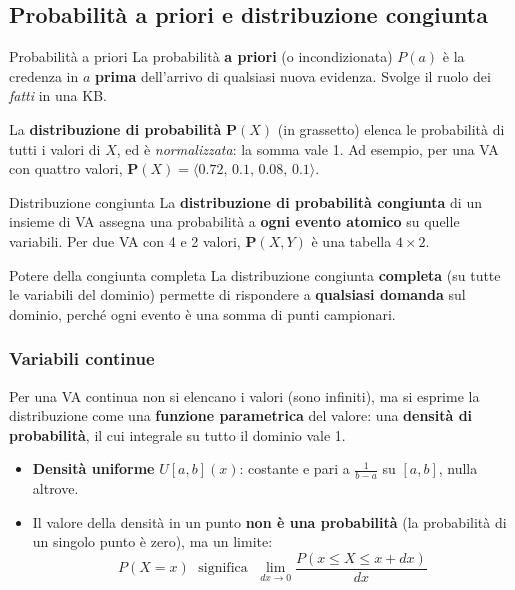 \documentclass[11pt, a4paper]{article}
\renewcommand{\emph}[1]{\textcolor{verdechiaro}{\itshape #1}}
\newcommand{\Pv}{\mathbf{P}}               %
\newcommand{\tup}[1]{\langle #1 \rangle}    %
\begin{document}
\subsection{Probabilità a priori e distribuzione congiunta}

\begin{defbox}{Probabilità a priori}
  La probabilità \textbf{a priori} (o incondizionata) $P(a)$ è la credenza in $a$ \textbf{prima} dell'arrivo di qualsiasi nuova evidenza. Svolge il ruolo dei \emph{fatti} in una KB.

  La \textbf{distribuzione di probabilità} $\Pv(X)$ (in grassetto) elenca le probabilità di tutti i valori di $X$, ed è \emph{normalizzata}: la somma vale 1. Ad esempio, per una VA con quattro valori, $\Pv(X) = \tup{0.72,\, 0.1,\, 0.08,\, 0.1}$.
\end{defbox}

\begin{defbox}{Distribuzione congiunta}
  La \textbf{distribuzione di probabilità congiunta} di un insieme di VA assegna una probabilità a \textbf{ogni evento atomico} su quelle variabili. Per due VA con 4 e 2 valori, $\Pv(X, Y)$ è una tabella $4 \times 2$.
\end{defbox}

\begin{chiave}{Potere della congiunta completa}
  La distribuzione congiunta \textbf{completa} (su tutte le variabili del dominio) permette di rispondere a \textbf{qualsiasi domanda} sul dominio, perché ogni evento è una somma di punti campionari.
\end{chiave}

\subsubsection*{Variabili continue}

Per una VA continua non si elencano i valori (sono infiniti), ma si esprime la distribuzione come una \textbf{funzione parametrica} del valore: una \textbf{densità di probabilità}, il cui integrale su tutto il dominio vale 1.

\begin{itemize}
  \item \textbf{Densità uniforme} $U[a,b](x)$: costante e pari a $\frac{1}{b-a}$ su $[a,b]$, nulla altrove.
  \item Il valore della densità in un punto \textbf{non è una probabilità} (la probabilità di un singolo punto è zero), ma un limite:
  \[
    P(X = x) \;\text{ significa }\; \lim_{dx\to 0} \frac{P(x \le X \le x + dx)}{dx}
  \]
\end{itemize}
\end{document}
